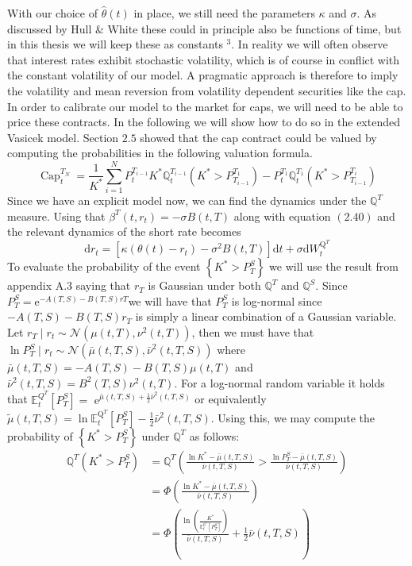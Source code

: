 \documentclass[12pt,twoside]{reedthesis}
\begin{document}
With our choice of \(\hat{\theta}(t)\) in place, we still need the parameters \(\kappa\) and \(\sigma\). As discussed by Hull \& White these could in principle also be functions of time, but in this thesis we will keep these as constants \(^{3}\). In reality we will often observe that interest rates exhibit stochastic volatility, which is of course in conflict with the constant volatility of our model. A pragmatic approach is therefore to imply the volatility and mean reversion from volatility dependent securities like the cap. In order to calibrate our model to the market for caps, we will need to be able to price these contracts. In the following we will show how to do so in the extended Vasicek model. Section \(2.5\) showed that the cap contract could be valued by computing the probabilities in the following valuation formula.
\[
\operatorname{Cap}_{t}^{T_{N}}=\frac{1}{K^{*}} \sum_{i=1}^{N} P_{t}^{T_{i-1}} K^{*} \mathbb{Q}_{t}^{T_{i-1}}\left(K^{*}>P_{T_{i-1}}^{T_{1}}\right)-P_{t}^{T_{1}} \mathbb{Q}_{t}^{T_{1}}\left(K^{*}>P_{T_{i-1}}^{T_{i}}\right)
\]
Since we have an explicit model now, we can find the dynamics under the \(\mathbb{Q}^{T}\) measure. Using that \(\beta^{T}\left(t, r_{t}\right)=-\sigma B(t, T)\) along with equation \((2.40)\) and the relevant dynamics of the short rate becomes
\[
\mathrm{d} r_{t}=\left[\kappa\left(\theta(t)-r_{t}\right)-\sigma^{2} B(t, T)\right] \mathrm{d} t+\sigma \mathrm{d} W_{t}^{\mathrm{Q}^{T}}
\]
To evaluate the probability of the event \(\left\{K^{*}>P_{T}^{S}\right\}\) we will use the result from appendix A.3 saying that \(r_{T}\) is Gaussian under both \(\mathbb{Q}^{T}\) and \(\mathbb{Q}^{S}\). Since \(P_{T}^{S}=\mathrm{e}^{-A(T, S)-B(T, S) r T}\)we will have that \(P_{T}^{S}\) is log-normal since \(-A(T, S)-B(T, S) r_{T}\) is simply a linear combination of a Gaussian variable. Let \(r_{T} \mid r_{t} \sim \mathcal{N}\left(\mu(t, T), \nu^{2}(t, T)\right)\), then we must have that \(\ln P_{T}^{S} \mid r_{t} \sim \mathcal{N}\left(\bar{\mu}(t, T, S), \bar{\nu}^{2}(t, T, S)\right)\) where \(\bar{\mu}(t, T, S)=-A(T, S)-B(T, S) \mu(t, T)\) and \(\bar{\nu}^{2}(t, T, S)=B^{2}(T, S) \nu^{2}(t, T) .\) For a log-normal random variable it holds that \(\mathbb{E}_{t}^{Q^{T}}\left[P_{T}^{S}\right]=\) \(\mathrm{e}^{\bar{\mu}(t, T, S)+\frac{1}{2} \bar{\nu}^{2}(t, T, S)}\) or equivalently \(\tilde{\mu}(t, T, S)=\ln \mathbb{E}_{t}^{\mathrm{Q}^{T}}\left[P_{T}^{S}\right]-\frac{1}{2} \bar{\nu}^{2}(t, T, S)\). Using this, we may compute the probability of \(\left\{K^{*}>P_{T}^{S}\right\}\) under \(\mathbb{Q}^{T}\) as follows:
\[
\begin{aligned}
\mathbb{Q}^{T}\left(K^{*}>P_{T}^{S}\right) &=\mathbb{Q}^{T}\left(\frac{\ln K^{*}-\bar{\mu}(t, T, S)}{\bar{\nu}(t, T, S)}>\frac{\ln P_{T}^{S}-\bar{\mu}(t, T, S)}{\bar{\nu}(t, T, S)}\right) \\
&=\Phi\left(\frac{\ln K^{*}-\bar{\mu}(t, T, S)}{\bar{\nu}(t, T, S)}\right) \\
&=\Phi\left(\frac{\ln \left(\frac{K^{*}}{\mathbb{E}_{t}^{0^{T}}\left[P_{T}^{S}\right]}\right)}{\bar{\nu}(t, T, S)}+\frac{1}{2} \bar{\nu}(t, T, S)\right)
\end{aligned}
\]
\end{document}

